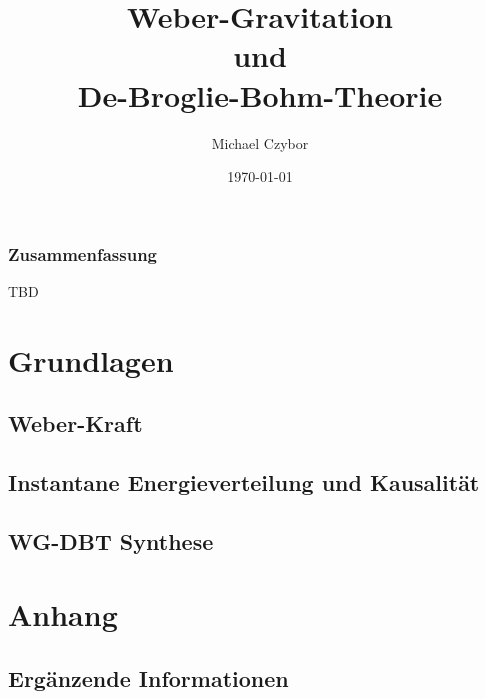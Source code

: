 \documentclass[10pt,oneside,openright]{book} %
\numberwithin{equation}{section}
\begin{document}
\title{Weber-Gravitation\\und\\De-Broglie-Bohm-Theorie}
\author{Michael Czybor}
\date{\today}
\maketitle

\section*{Zusammenfassung}
TBD

\tableofcontents

\part{Grundlagen}
\chapter{Weber-Kraft}
\label{chapter:weber_kraft}


\chapter{Instantane Energieverteilung und Kausalität}

\chapter{WG-DBT Synthese}


\part{Anhang}
\chapter{Ergänzende Informationen}
\label{chapter:information}



\end{document}
